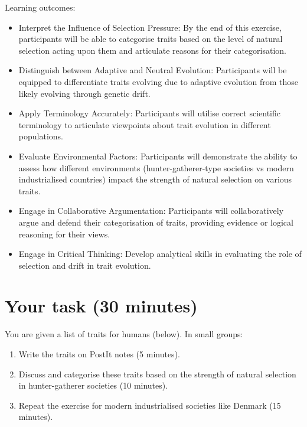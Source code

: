 \documentclass[
  a4paper]{book}
\providecommand{\tightlist}{%
  \setlength{\itemsep}{0pt}\setlength{\parskip}{0pt}}
\begin{document}
\begin{do-something}
Learning outcomes:

\begin{itemize}
\tightlist
\item
  Interpret the Influence of Selection Pressure: By the end of this
  exercise, participants will be able to categorise traits based on the
  level of natural selection acting upon them and articulate reasons for
  their categorisation.
\item
  Distinguish between Adaptive and Neutral Evolution: Participants will
  be equipped to differentiate traits evolving due to adaptive evolution
  from those likely evolving through genetic drift.
\item
  Apply Terminology Accurately: Participants will utilise correct
  scientific terminology to articulate viewpoints about trait evolution
  in different populations.
\item
  Evaluate Environmental Factors: Participants will demonstrate the
  ability to assess how different environments (hunter-gatherer-type
  societies vs modern industrialised countries) impact the strength of
  natural selection on various traits.
\item
  Engage in Collaborative Argumentation: Participants will
  collaboratively argue and defend their categorisation of traits,
  providing evidence or logical reasoning for their views.
\item
  Engage in Critical Thinking: Develop analytical skills in evaluating
  the role of selection and drift in trait evolution.
\end{itemize}
\end{do-something}

\section{Your task (30 minutes)}\label{your-task-30-minutes}

You are given a list of traits for humans (below). In small groups:

\begin{enumerate}
\def\labelenumi{\arabic{enumi}.}
\tightlist
\item
  Write the traits on PostIt notes (5 minutes).
\item
  Discuss and categorise these traits based on the strength of natural selection in hunter-gatherer societies (10 minutes).
\item
  Repeat the exercise for modern industrialised societies like Denmark (15 minutes).
\end{enumerate}
\end{document}
